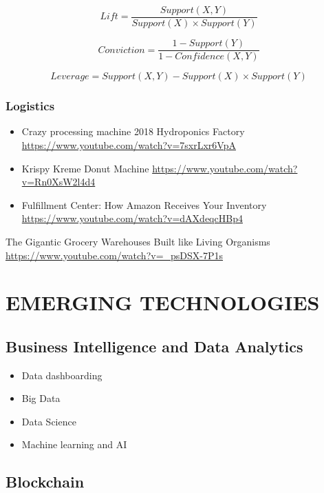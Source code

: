 \documentclass[]{book}
\providecommand{\tightlist}{%
  \setlength{\itemsep}{0pt}\setlength{\parskip}{0pt}}
\begin{document}
\[Lift = \frac{Support(X,Y)}{Support(X) \times Support(Y)}\]

\[Conviction = \frac{1 - Support(Y)}{1 - Confidence(X,Y)}\]

\[Leverage = Support(X,Y) - Support(X)\times Support(Y)\]

\hypertarget{logistics}{%
\subsection{Logistics}\label{logistics}}

\begin{itemize}
\item
  Crazy processing machine 2018 \textbar{} Hydroponics Factory
  \url{https://www.youtube.com/watch?v=7sxrLxr6VpA}
\item
  Krispy Kreme Donut Machine
  \url{https://www.youtube.com/watch?v=Rn0XsW2l4d4}
\item
  Fulfillment Center:
  How Amazon Receives Your Inventory \url{https://www.youtube.com/watch?v=dAXdeqcHBp4}
\end{itemize}

The Gigantic Grocery Warehouses Built like Living Organisms \url{https://www.youtube.com/watch?v=_psDSX-7P1s}

\hypertarget{emerging-technologies}{%
\chapter{EMERGING TECHNOLOGIES}\label{emerging-technologies}}

\hypertarget{business-intelligence-and-data-analytics}{%
\section{Business Intelligence and Data Analytics}\label{business-intelligence-and-data-analytics}}

\begin{itemize}
\tightlist
\item
  Data dashboarding
\item
  Big Data
\item
  Data Science
\item
  Machine learning and AI
\end{itemize}

\hypertarget{blockchain}{%
\section{Blockchain}\label{blockchain}}
\end{document}
